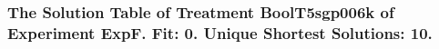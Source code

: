  \begin{frame}
 \fontsize{8pt}{9pt}\selectfont
 \frametitle{ The Solution Table of Treatment BoolT5sgp006k of Experiment ExpF. Fit: 0. Unique Shortest Solutions: 10. }

 \label{ExpFSolutionTable004.tex}  
 \end{frame}

